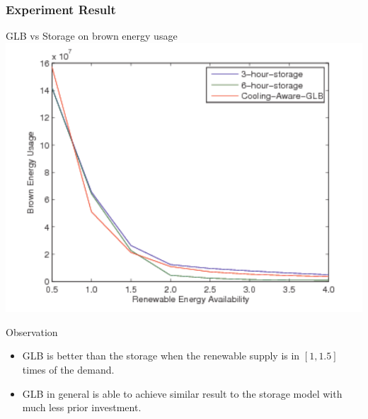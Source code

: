 \documentclass[xcolor=dvipsnames]{beamer}
\begin{document}
\begin{frame}
\frametitle{Experiment Result}
\begin{block}
{GLB vs Storage on brown energy usage}
\includegraphics[scale = 0.38]{brown_storage.pdf}
\end{block}
\begin{block}
{Observation}
\begin{itemize}
\item
GLB is better than the storage when the renewable supply is in $[1, 1.5]$ times of the demand. 
\item
GLB in general is able to achieve similar result to the storage model with much less prior investment.
\end{itemize}
\end{block}
\end{frame}
%
%
\end{document}
